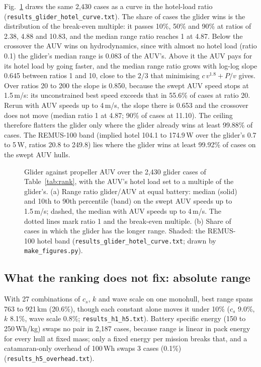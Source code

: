 \documentclass[conference]{IEEEtran}
\begin{document}
Fig.~\ref{fig:gliderhotel} draws the same 2{,}430 cases as a curve in the hotel-load ratio
(\texttt{results\_glider\_hotel\_curve.txt}). The share of cases the glider wins is the
distribution of the break-even multiple: it passes 10\%, 50\% and 90\% at ratios of 2.38, 4.88
and 10.83, and the median range ratio reaches 1 at 4.87. Below the crossover the AUV wins on
hydrodynamics, since with almost no hotel load (ratio 0.1) the glider's median range is 0.083 of
the AUV's. Above it the AUV pays for its hotel load by going faster, and the median range ratio
grows with log-log slope 0.645 between ratios 1 and 10, close to the $2/3$ that minimising
$c\,v^{1.8} + P/v$ gives. Over ratios 20 to 200 the slope is 0.850, because the swept AUV speed
stops at 1.5\,m/s: its unconstrained best speed exceeds that in 55.6\% of cases at ratio 20.
Rerun with AUV speeds up to 4\,m/s, the slope there is 0.653 and the crossover does not move
(median ratio 1 at 4.87; 90\% of cases at 11.10). The ceiling therefore flatters the glider only
where the glider already wins at least 99.88\% of cases. The REMUS-100 band (implied hotel 104.1 to 174.9\,W over the
glider's 0.7 to 5\,W, ratios 20.8 to 249.8) lies where the glider wins at least 99.92\% of cases
on the swept AUV hulls.

\begin{figure}[t]
\centering
\resizebox{\columnwidth}{!}{}
\caption{Glider against propeller AUV over the 2{,}430 glider cases of Table~\ref{tab:rank}, with
the AUV's hotel load set to a multiple of the glider's. (a) Range ratio glider/AUV at equal battery:
median (solid) and 10th to 90th percentile (band) on the swept AUV speeds up to 1.5\,m/s;
dashed, the median with AUV speeds up to 4\,m/s. The dotted lines mark ratio 1 and the
break-even multiple. (b) Share of cases in which the glider has the longer range. Shaded: the
REMUS-100 hotel band (\texttt{results\_glider\_hotel\_curve.txt}; drawn by \texttt{make\_figures.py}).}
\label{fig:gliderhotel}
\end{figure}

\subsection{What the ranking does not fix: absolute range}
With 27 combinations of $c_s$, $k$ and wave scale on one monohull, best range spans 763 to 921\,km
(20.6\%), though each constant alone moves it under 10\% ($c_s$ 9.0\%, $k$ 8.1\%, wave scale 0.8\%;
\texttt{results\_h1\_h5.txt}). Battery specific energy (150 to 250\,Wh/kg) swaps no pair in 2{,}187
cases, because range is linear in pack energy for every hull at fixed mass; only a fixed energy per
mission breaks that, and a catamaran-only overhead of 100\,Wh swaps 3 cases (0.1\%)
(\texttt{results\_h5\_overhead.txt}).
\end{document}
